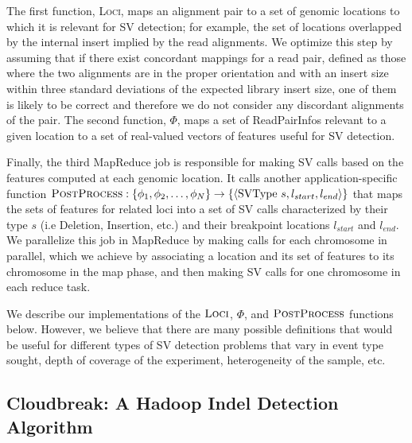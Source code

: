 \documentclass[11pt]{article}
\begin{document}
The first function, \textsc{Loci}, maps an alignment pair to a set of genomic locations to which it is relevant for SV detection; for example, the set of locations overlapped by the internal insert implied by the read alignments. We optimize this step by assuming that if there exist concordant mappings for a read pair, defined as those where the two alignments are in the proper orientation and with an insert size within three standard deviations of the expected library insert size, one of them is likely to be correct and therefore we do not consider any discordant alignments of the pair. The second function, $\Phi$, maps a set of ReadPairInfos relevant to a given location to a set of real-valued vectors of features useful for SV detection. 

Finally, the third MapReduce job is responsible for making SV calls based on the features computed at each genomic location. It calls another application-specific function  $\textsc{PostProcess} : \left\{\phi_1,\phi_2,\ldots,\phi_N\right\} \rightarrow \left\{\langle  \textrm{SVType } s, l_{start}, l_{end} \rangle\right\}$  that maps the sets of features for related loci into a set of SV calls characterized by their type $s$ (i.e Deletion, Insertion, etc.) and their breakpoint locations $l_{start}$ and $l_{end}$. We parallelize this job in MapReduce by making calls for each chromosome in parallel, which we achieve by associating a location and its set of features to its chromosome in the map phase, and then making SV calls for one chromosome in each reduce task.

We describe our implementations of the $\textsc{Loci}$, $\Phi$, and $\textsc{PostProcess}$ functions below. However, we believe that there are many possible definitions that would be useful for different types of SV detection problems that vary in event type sought, depth of coverage of the experiment, heterogeneity of the sample, etc.

\subsection{Cloudbreak: A Hadoop Indel Detection Algorithm}
\end{document}
